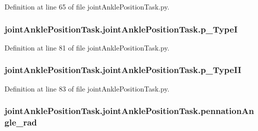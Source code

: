 Definition at line 65 of file joint\+Ankle\+Position\+Task.\+py.

\subsubsection[{\texorpdfstring{p\+\_\+\+TypeI}{p_TypeI}}]{\setlength{\rightskip}{0pt plus 5cm}joint\+Ankle\+Position\+Task.\+joint\+Ankle\+Position\+Task.\+p\+\_\+\+TypeI}\hypertarget{classjoint_ankle_position_task_1_1joint_ankle_position_task_a75fb283c7cd53943125199807edd9538}{}\label{classjoint_ankle_position_task_1_1joint_ankle_position_task_a75fb283c7cd53943125199807edd9538}


Definition at line 81 of file joint\+Ankle\+Position\+Task.\+py.

\subsubsection[{\texorpdfstring{p\+\_\+\+Type\+II}{p_TypeII}}]{\setlength{\rightskip}{0pt plus 5cm}joint\+Ankle\+Position\+Task.\+joint\+Ankle\+Position\+Task.\+p\+\_\+\+Type\+II}\hypertarget{classjoint_ankle_position_task_1_1joint_ankle_position_task_aadba5a426f766cbdfec79a187c5c09a7}{}\label{classjoint_ankle_position_task_1_1joint_ankle_position_task_aadba5a426f766cbdfec79a187c5c09a7}


Definition at line 83 of file joint\+Ankle\+Position\+Task.\+py.

\subsubsection[{\texorpdfstring{pennation\+Angle\+\_\+rad}{pennationAngle_rad}}]{\setlength{\rightskip}{0pt plus 5cm}joint\+Ankle\+Position\+Task.\+joint\+Ankle\+Position\+Task.\+pennation\+Angle\+\_\+rad}\hypertarget{classjoint_ankle_position_task_1_1joint_ankle_position_task_a2112adfad65bb895e4baa3e79143109b}{}\label{classjoint_ankle_position_task_1_1joint_ankle_position_task_a2112adfad65bb895e4baa3e79143109b}


